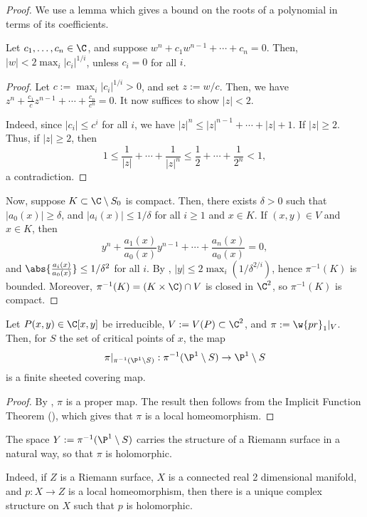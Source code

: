 \documentclass[11pt]{report}
\begin{document}
\begin{proof}
We use a lemma which gives a bound on the roots of a polynomial in terms of its coefficients.
\begin{lem}[][label=lem:rootbound]
    Let $c_1,\dots,c_n \in \C$, and suppose $w^n+c_1w^{n-1}+\cdots + c_n=0$. Then, $|w|<2 \max _{i}|c_i|^{1/i}$, unless $c_i=0$ for all $i$.
\end{lem}

\begin{proof}
    Let $c:= \max_i |c_i|^{1/i}>0$, and set $z:=w/c$. Then, we have $z^n+\frac{c_1}{c}z^{n-1}+\cdots + \frac{c_n}{c^n}=0$. It now suffices to show $|z|<2$.

    Indeed, since $|c_i| \leq c^i$ for all $i$, we have $|z|^n \leq |z|^{n-1}+\cdots + |z|+1$. If $|z| \geq 2$. Thus, if $|z| \geq 2$, then
    $$1 \leq \frac{1}{|z|}+\cdots + \frac{1}{|z|^n}\leq \frac{1}{2}+\cdots + \frac{1}{2^n}<1,$$
    a contradiction.
\end{proof}
    Now, suppose $K \subset \C \setminus S_0$ is compact. Then, there exists $\delta>0$ such that $|a_0(x)| \geq \delta$, and $|a_i(x)| \leq 1/\delta$ for all $i \geq 1$ and $x \in K$. If $(x,y) \in V$ and $x \in K$, then
    $$y^n+\frac{a_1(x)}{a_0(x)}y^{n-1} +\cdots + \frac{a_n(x)}{a_0(x)}=0,$$
    and $\abs{\frac{a_i(x)}{a_0(x)}}\leq 1/\delta^2$ for all $i$. By , $|y| \leq 2\max_i(1/\delta^{2/i})$, hence $\pi^{-1}(K)$ is bounded. Moreover, $\pi^{-1}(K) =(K \times \C) \cap V$ is closed in $\C^2$, so $\pi^{-1}(K)$ is compact.
\end{proof}

\begin{cor}
    Let $P(x,y) \in \C[x,y]$ be irreducible, $V:=V(P) \subset \C^2$, and $\pi :=\w{pr}_1|_V$. Then, for $S$ the set of critical points of $x$, the map
    $$\pi|_{\pi^{-1}(\P^1\setminus S) }:\pi^{-1}(\P^1 \setminus S) \to \P^1 \setminus S$$
    is a finite sheeted covering map.
\end{cor}

\begin{proof}
    By , $\pi$ is a proper map. The result then follows from the Implicit Function Theorem (), which gives that $\pi$ is a local homeomorphism.
\end{proof}

\begin{rmk}
The space $Y:= \pi^{-1}(\P^1\setminus S)$ carries the structure of a Riemann surface in a natural way, so that $\pi$ is holomorphic. 
\end{rmk}
Indeed, if $Z$ is a Riemann surface, $X$ is a connected real 2 dimensional manifold, and $p:X \to Z$ is a local homeomorphism, then there is a unique complex structure on $X$ such that $p$ is holomorphic.
\end{document}
